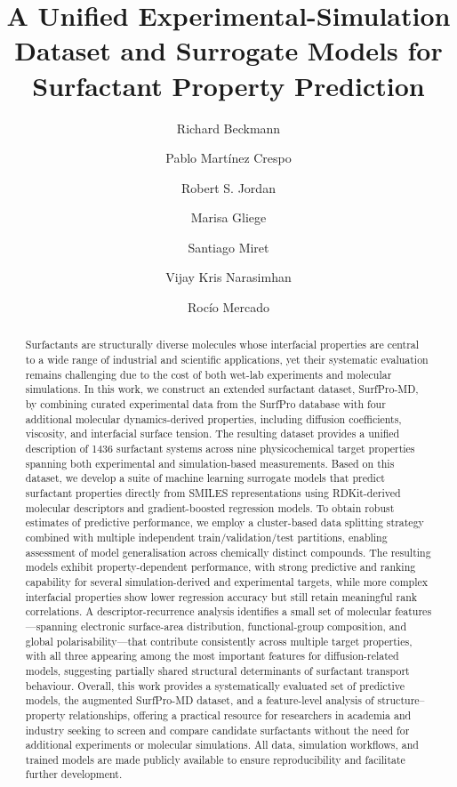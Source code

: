 \documentclass[letterpaper]{article}
\author[1]{Richard Beckmann}
\author[1]{Pablo Martínez Crespo}
\author[2]{Robert S. Jordan}
\author[3]{Marisa Gliege}
\author[4]{Santiago Miret}
\author[5]{Vijay Kris Narasimhan}
\author[1]{Rocío Mercado} %
\affil[1]{AI Laboratory for Molecular Engineering, Department of Computer Science and Engineering, Chalmers University of Technology \& University of Gothenburg}
\affil[2]{Technology Research, Intel Corporation}
\affil[3]{Chief Technology Office, EMD Electronics}
\affil[4]{Lila Sciences}
\affil[5]{Merck KGaA, Darmstadt, Germany}
\title{A Unified Experimental-Simulation Dataset and Surrogate Models for Surfactant Property Prediction}
\begin{document}
\maketitle{}

\begin{abstract}
Surfactants are structurally diverse molecules whose interfacial properties are central to a wide range of industrial and scientific applications, yet their systematic evaluation remains challenging due to the cost of both wet-lab experiments and molecular simulations. In this work, we construct an extended surfactant dataset, SurfPro-MD, by combining curated experimental data from the SurfPro database with four additional molecular dynamics-derived properties, including diffusion coefficients, viscosity, and interfacial surface tension. The resulting dataset provides a unified description of 1436 surfactant systems across nine physicochemical target properties spanning both experimental and simulation-based measurements.
Based on this dataset, we develop a suite of machine learning surrogate models that predict surfactant properties directly from SMILES representations using RDKit-derived molecular descriptors and gradient-boosted regression models. To obtain robust estimates of predictive performance, we employ a cluster-based data splitting strategy combined with multiple independent train/validation/test partitions, enabling assessment of model generalisation across chemically distinct compounds.
The resulting models exhibit property-dependent performance, with strong predictive and ranking capability for several simulation-derived and experimental targets, while more complex interfacial properties show lower regression accuracy but still retain meaningful rank correlations. A descriptor-recurrence analysis identifies a small set of molecular features---spanning electronic surface-area distribution, functional-group composition, and global polarisability---that contribute consistently across multiple target properties, with all three appearing among the most important features for diffusion-related models, suggesting partially shared structural determinants of surfactant transport behaviour. Overall, this work provides a systematically evaluated set of predictive models, the augmented SurfPro-MD dataset, and a feature-level analysis of structure--property relationships, offering a practical resource for researchers in academia and industry seeking to screen and compare candidate surfactants without the need for additional experiments or molecular simulations. All data, simulation workflows, and trained models are made publicly available to ensure reproducibility and facilitate further development.
\end{abstract}
\end{document}
